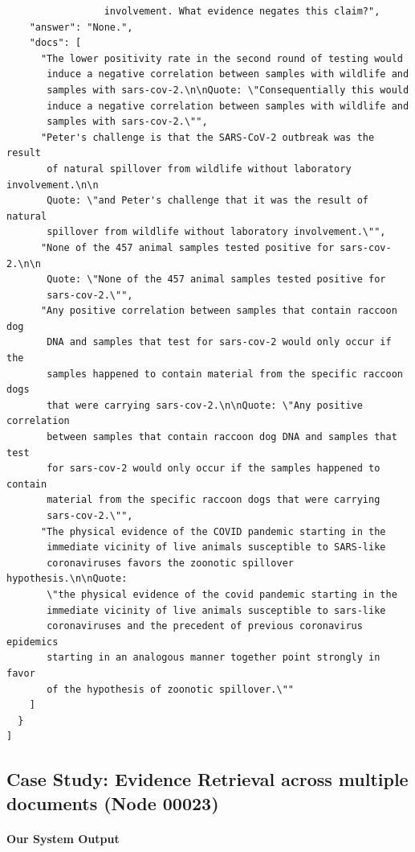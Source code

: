 \documentclass{article}
\begin{document}
\begin{verbatim}
                 involvement. What evidence negates this claim?",
    "answer": "None.",
    "docs": [
      "The lower positivity rate in the second round of testing would 
       induce a negative correlation between samples with wildlife and 
       samples with sars-cov-2.\n\nQuote: \"Consequentially this would 
       induce a negative correlation between samples with wildlife and 
       samples with sars-cov-2.\"",
      "Peter's challenge is that the SARS-CoV-2 outbreak was the result 
       of natural spillover from wildlife without laboratory involvement.\n\n
       Quote: \"and Peter's challenge that it was the result of natural 
       spillover from wildlife without laboratory involvement.\"",
      "None of the 457 animal samples tested positive for sars-cov-2.\n\n
       Quote: \"None of the 457 animal samples tested positive for 
       sars-cov-2.\"",
      "Any positive correlation between samples that contain raccoon dog 
       DNA and samples that test for sars-cov-2 would only occur if the 
       samples happened to contain material from the specific raccoon dogs 
       that were carrying sars-cov-2.\n\nQuote: \"Any positive correlation 
       between samples that contain raccoon dog DNA and samples that test 
       for sars-cov-2 would only occur if the samples happened to contain 
       material from the specific raccoon dogs that were carrying 
       sars-cov-2.\"",
      "The physical evidence of the COVID pandemic starting in the 
       immediate vicinity of live animals susceptible to SARS-like 
       coronaviruses favors the zoonotic spillover hypothesis.\n\nQuote: 
       \"the physical evidence of the covid pandemic starting in the 
       immediate vicinity of live animals susceptible to sars-like 
       coronaviruses and the precedent of previous coronavirus epidemics 
       starting in an analogous manner together point strongly in favor 
       of the hypothesis of zoonotic spillover.\""
    ]
  }
]
\end{verbatim}



\subsection{Case Study: Evidence Retrieval across multiple documents (Node 00023)}
\paragraph{Our System Output}
\end{document}
